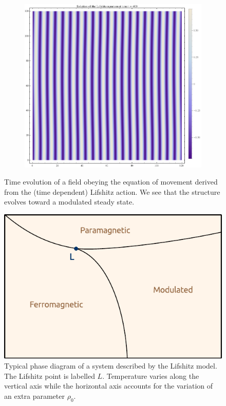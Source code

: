 \begin{figure}[htp]
\begin{subfigure}{.33\textwidth}
	\centering
	\includegraphics[width=.9\linewidth]{img/chap1/sol_Lif_t400.png}
	\caption{}
	\label{lif_t400}
\end{subfigure}
\caption{Time evolution of a field obeying the equation of movement derived from the (time dependent) Lifshitz action. We see that the structure evolves toward a modulated steady state.}
\label{fig:evol_strip}
\end{figure}


\begin{figure}[htp]
\begin{center}
\includegraphics[scale=1]{img/chap1/phase_diagram_2.pdf}
\caption{Typical phase diagram of a system described by the Lifshitz model. The Lifshitz point is labelled $L$. Temperature varies along the vertical axis while the horizontal axis accounts for the variation of an extra parameter $\rho_0$.}
\label{fig:phase_diagram}
\end{center}
\end{figure}

